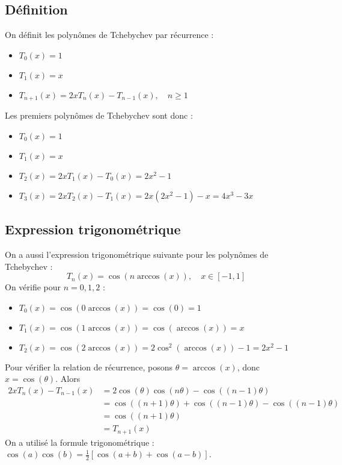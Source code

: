 \documentclass[oneside]{book}
\begin{document}
\subsection{Définition}

On définit les polynômes de Tchebychev par récurrence :
\begin{itemize}
    \item $T_0(x) = 1$
    \item $T_1(x) = x$
    \item $T_{n+1}(x) = 2xT_n(x) - T_{n-1}(x), \quad n \geq 1$
\end{itemize}
Les premiers polynômes de Tchebychev sont donc :
\begin{itemize}
    \item $T_0(x) = 1$
    \item $T_1(x) = x$
    \item $T_2(x) = 2xT_1(x) - T_0(x) = 2x^2 - 1$
    \item $T_3(x) = 2xT_2(x) - T_1(x) = 2x(2x^2 - 1) - x = 4x^3 - 3x$
\end{itemize}

\subsection{Expression trigonométrique}

On a aussi l'expression trigonométrique suivante pour les polynômes de Tchebychev :
\[
T_n(x) = \cos(n \arccos(x)), \quad x \in [-1, 1]
\]
On vérifie pour $n=0, 1, 2$ :
\begin{itemize}
    \item $T_0(x) = \cos(0 \arccos(x)) = \cos(0) = 1$
    \item $T_1(x) = \cos(1 \arccos(x)) = \cos(\arccos(x)) = x$
    \item $T_2(x) = \cos(2 \arccos(x)) = 2\cos^2(\arccos(x)) - 1 = 2x^2 - 1$
\end{itemize}
Pour vérifier la relation de récurrence, posons $\theta = \arccos(x)$, donc $x = \cos(\theta)$. Alors
\begin{align*}
2xT_n(x) - T_{n-1}(x) &= 2\cos(\theta)\cos(n\theta) - \cos((n-1)\theta) \\
&= \cos((n+1)\theta) + \cos((n-1)\theta) - \cos((n-1)\theta) \\
&= \cos((n+1)\theta) \\
&= T_{n+1}(x)
\end{align*}
On a utilisé la formule trigonométrique : $\cos(a)\cos(b) = \frac{1}{2} [\cos(a+b) + \cos(a-b)]$.
\end{document}
